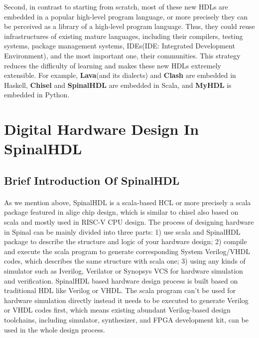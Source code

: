 \documentclass{article}
\begin{document}
Second, in contrast to starting from scratch, most of these new HDLs are embedded in a popular high-level program language, or more precisely they can be perceived as a library of a high-level program language. Thus, they could reuse infrastructures of existing mature languages, including their compilers, testing systems, package management systems, IDEs(IDE: Integrated Development Environment), and the most important one, their communities. This strategy reduces the difficulty of learning and makes these new HDLs extremely extensible. For example, \textbf{Lava}(and its dialects) and \textbf{Clash} are embedded in Haskell, \textbf{Chisel} and \textbf{SpinalHDL} are embedded in Scala, and \textbf{MyHDL} is embedded in Python.



\section{Digital Hardware Design In SpinalHDL}
\subsection{Brief Introduction Of SpinalHDL}
\paragraph{}
As we mention above, SpinalHDL\cite{spinalhdl_doc} is a scala-based HCL or more precisely a scala package featured in alige chip design, which is similar to chisel also based on scala and mostly used in RISC-V CPU design. The process of designing hardware in Spinal can be mainly divided into three parts: 1) use scala and SpinalHDL package to describe the structure and logic of your hardware design; 2) compile and execute the scala program to generate corresponding System Verilog/VHDL codes, which describes the same structure with scala one; 3) using any kinds of simulator such as Iverilog, Verilator or Synopsys VCS for hardware simulation and verification. SpinalHDL based hardware design process is built based on traditional HDL like Verilog or VHDL. The scala program can’t be used for hardware simulation directly instead it needs to be executed to generate Verilog or VHDL codes first, which means existing abundant Verilog-based design toolchains, including simulator, synthesizer, and FPGA development kit, can be used in the whole design process.
\end{document}
